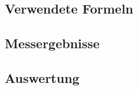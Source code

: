\documentclass[12pt,a4paper]{article}
\begin{document}
\subsection{Verwendete Formeln}
\subsection{Messergebnisse}
\subsection{Auswertung}
\end{document}
